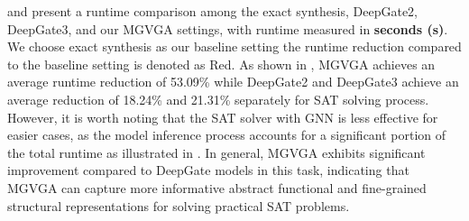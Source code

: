  and  present a runtime comparison among the exact synthesis, DeepGate2, DeepGate3, and our MGVGA settings, with runtime measured in \textbf{seconds (s)}.
We choose exact synthesis as our baseline setting the runtime reduction compared to the baseline setting is denoted as Red.
As shown in , MGVGA achieves an average runtime reduction of 53.09\% while DeepGate2 and DeepGate3 achieve an average reduction of 18.24\% and 21.31\% separately for SAT solving process.
However, it is worth noting that the SAT solver with GNN is less
effective for easier cases, as the model inference process accounts
for a significant portion of the total runtime as illustrated in . 
In general, MGVGA exhibits significant improvement compared to DeepGate models in this task, indicating that MGVGA can capture more informative abstract functional and fine-grained structural representations for solving practical SAT problems.
\begin{table*}[]
\caption{The comparison of SAT solving runtime (solver only).}
\centering
\label{table:sat_solver}
\end{table*}

